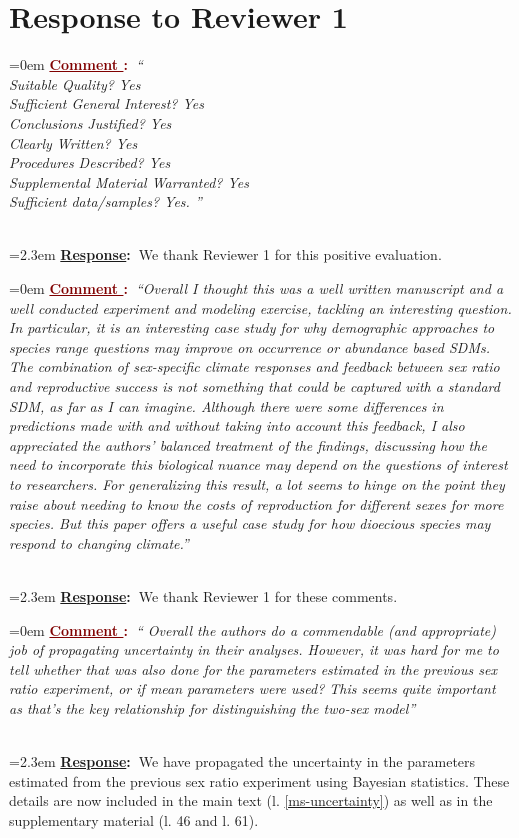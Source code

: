 \documentclass[12pt]{article}
\newcounter{cN}
\newcommand{\comment}[1]{
	\vspace{2em}
	\refstepcounter{cN} %
	\noindent \hangindent=0em \textbf{\textcolor{Maroon}{\uline{Comment \thecN}:~}}\emph{``#1''}
	}
\newcommand{\response}[1]{
	\\[0.25em]
	\hangindent=2.3em \textbf{\textcolor{NavyBlue}{\uline{Response}:~}}#1
	}
\begin{document}
\section{Response to Reviewer 1}
\vspace{-2em}

\comment{
\\
Suitable Quality? Yes
\\
Sufficient General Interest? Yes
\\
Conclusions Justified? Yes
\\
Clearly Written? Yes
\\
Procedures Described? Yes
\\
Supplemental Material Warranted? Yes
\\
Sufficient data/samples? Yes.
}
\response{We thank Reviewer 1 for this positive  evaluation.}

\comment{Overall I thought this was a well written manuscript and a well conducted experiment and modeling exercise, tackling an interesting question. In particular, it is an interesting case study for why demographic approaches to species range questions may improve on occurrence or abundance based SDMs. The combination of sex-specific climate responses and feedback between sex ratio and reproductive success is not something that could be captured with a standard SDM, as far as I can imagine. Although there were some differences in predictions made with and without taking into account this feedback, I also appreciated the authors’ balanced treatment of the findings, discussing how the need to incorporate this biological nuance may depend on the questions of interest to researchers. For generalizing this result, a lot seems to hinge on the point they raise about needing to know the costs of reproduction for different sexes for more species. But this paper offers a
useful case study for how dioecious species may respond to changing climate.}
\response{We thank Reviewer 1 for these comments.}

\comment{ Overall the authors do a commendable (and appropriate) job of propagating uncertainty in their analyses. However, it was hard for me to tell whether that was also done for the parameters estimated in the previous sex ratio experiment, or if mean parameters were used? This seems quite important as that’s the key
relationship for distinguishing the two-sex model}
\response{We have propagated the uncertainty in the parameters estimated from the previous sex ratio experiment using Bayesian statistics. 
These details are now included in the main text (l. \ref{ms-uncertainty}) as well as in the supplementary material (l. 46 and l. 61).}
\end{document}

